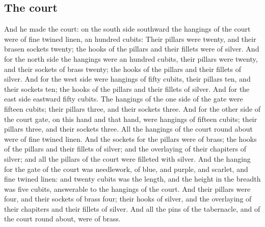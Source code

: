 \begin{biblechapter}
\section*{The court}
\verse And he made the court: on the south side southward the hangings of the court were of fine twined linen, an hundred cubits:
\verse Their pillars were twenty, and their brasen sockets twenty; the hooks of the pillars and their fillets were of silver.
\verse And for the north side the hangings were an hundred cubits, their pillars were twenty, and their sockets of brass twenty; the hooks of the pillars and their fillets of silver.
\verse And for the west side were hangings of fifty cubits, their pillars ten, and their sockets ten; the hooks of the pillars and their fillets of silver.
\verse And for the east side eastward fifty cubits.
\verse The hangings of the one side of the gate were fifteen cubits; their pillars three, and their sockets three.
\verse And for the other side of the court gate, on this hand and that hand, were hangings of fifteen cubits; their pillars three, and their sockets three.
\verse All the hangings of the court round about were of fine twined linen.
\verse And the sockets for the pillars were of brass; the hooks of the pillars and their fillets of silver; and the overlaying of their chapiters of silver; and all the pillars of the court were filleted with silver.
\verse And the hanging for the gate of the court was needlework, of blue, and purple, and scarlet, and fine twined linen: and twenty cubits was the length, and the height in the breadth was five cubits, answerable to the hangings of the court.
\verse And their pillars were four, and their sockets of brass four; their hooks of silver, and the overlaying of their chapiters and their fillets of silver.
\verse And all the pins of the tabernacle, and of the court round about, were of brass.

\end{biblechapter}
